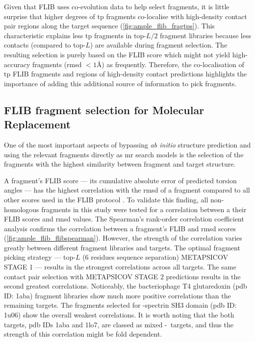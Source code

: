 Given that FLIB uses co-evolution data to help select fragments, it is little surprise that higher degrees of \gls{tp} fragments co-localise with high-density contact pair regions along the target sequence (\cref{fig:ample_flib_fragtps}). This characteristic explains less \gls{tp} fragments in top-$L/2$ fragment libraries because less contacts (compared to top-$L$) are available during fragment selection. The resulting selection is purely based on the FLIB score which might not yield high-accuracy fragments (\gls{rmsd} $<1$\AA) as frequently. Therefore, the co-localisation of \gls{tp} FLIB fragments and regions of high-density contact predictions highlights the importance of adding this additional source of information to pick fragments. 

\subsection{FLIB fragment selection for Molecular Replacement}
One of the most important aspects of bypassing \textit{ab initio} structure prediction and using the relevant fragments directly as \gls{mr} search models is the selection of the fragments with the highest similarity between fragment and target structure.

A fragment's FLIB score --- its cumulative absolute error of predicted torsion angles --- has the highest correlation with the \gls{rmsd} of a fragment compared to all other scores used in the FLIB protocol \cite{De_Oliveira2015-kb}. To validate this finding, all non-homologous fragments in this study were tested for a correlation between a their FLIB scores and \gls{rmsd} values. The Spearman's rank-order correlation coefficient analysis confirms the correlation between a fragment's FLIB and \gls{rmsd} scores (\cref{fig:ample_flib_flibspearman}). However, the strength of the correlation varies greatly between different fragment libraries and targets. The optimal fragment picking strategy --- top-$L$ (6 residues sequence separation) METAPSICOV STAGE 1 --- results in the strongest correlations across all targets. The same contact pair selection with METAPSICOV STAGE 2 predictions results in the second greatest correlations. Noticeably, the bacteriophage T4 glutaredoxin (\gls{pdb} ID: 1aba) fragment libraries show much more positive correlations than the remaining targets. The fragments selected for \textalpha-spectrin SH3 domain (\gls{pdb} ID: 1u06) show the overall weakest correlations. It is worth noting that the both targets, \gls{pdb} IDs 1aba and 1lo7, are classed as mixed \textalpha-\textbeta\ targets, and thus the strength of this correlation might be fold dependent.

